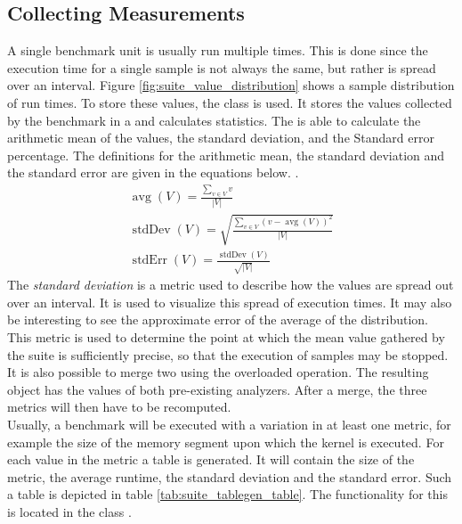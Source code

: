 \subsection{Collecting Measurements}
\label{sect:suite_design_collection}
A single benchmark unit is usually run multiple times. This is done since the execution time for a single sample is not always the same, but rather is spread over an interval. Figure \ref{fig:suite_value_distribution} shows a sample distribution of run times. To store these values, the class  is used. It stores the values collected by the benchmark in a  and calculates statistics. The  is able to calculate the arithmetic mean of the values, the standard deviation, and the Standard error percentage. The definitions for the arithmetic mean, the standard deviation and the standard error are given in the equations below. \cite{kuckartz2010statistik}.
\begin{gather}
\label{eq:suite_avg}
\operatorname{avg}(V) = \frac{\sum_{v \in V} v}{|V|}\\[2ex]
\label{eq:suite_stdDev}
\operatorname{stdDev}(V) = \sqrt{\frac{\sum_{v\in V} (v - \operatorname{avg}(V))^2}{|V|}}\\[2ex]
\label{eq:suite_stdErr}
\operatorname{stdErr}(V) = \frac{\operatorname{stdDev}(V)}{\sqrt{|V|}}
\end{gather}
The \textit{standard deviation} is a metric used to describe how the values are spread out over an interval. It is used to visualize this spread of execution times. It may also be interesting to see the approximate error of the average of the distribution. This metric is used to determine the point at which the mean value gathered by the suite is sufficiently precise, so that the execution of samples may be stopped. \cite{kuckartz2010statistik}\\

It is also possible to merge two  using the overloaded \code{+} operation. The resulting object has the values of both pre-existing analyzers. After a merge, the three metrics will then have to be recomputed. \\

Usually, a benchmark will be executed with a variation in at least one metric, for example the size of the memory segment upon which the kernel is executed. For each value in the metric a table is generated. It will contain the size of the metric, the average runtime, the standard deviation and the standard error. Such a table is depicted in table \ref{tab:suite_tablegen_table}. The functionality for this is located in the class . \\


